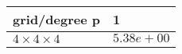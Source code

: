 \begin{tabular}{ll}
\hline
 grid/degree p         & 1          \\
\hline
 $4 \times 4 \times 4$ & $5.38e+00$ \\
\hline
\end{tabular}